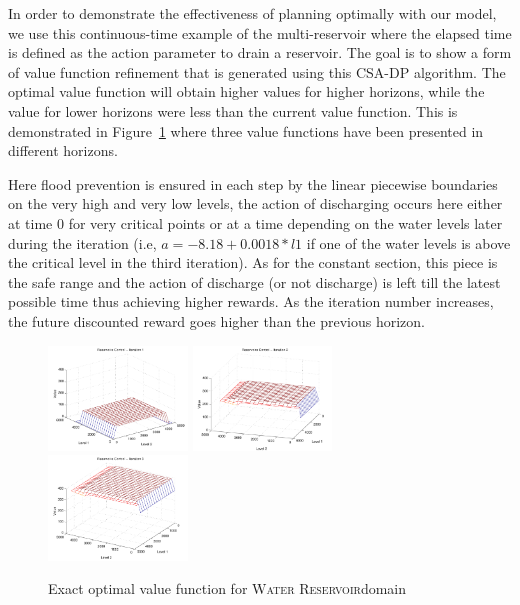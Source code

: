 \documentclass[letterpaper]{article}
\newcommand{\WaterReservoir}{\textsc{Water Reservoir}}
\begin{document}
In order to demonstrate the effectiveness of planning optimally with our model, we use this continuous-time example of the multi-reservoir where the elapsed time is defined as the action parameter to drain a reservoir. The goal is to show a form of value function refinement that is generated using this CSA-DP algorithm. The optimal value function will obtain higher values for higher horizons, while the value for lower horizons were less than the current value function. This is demonstrated in Figure~\ref{fig:reservoir} where three value functions have been presented in different horizons. 

Here flood prevention is ensured in each step by the linear piecewise boundaries on the very high and very low levels, the action of discharging occurs here either at time 0 for very critical points or at a time depending on the water levels later during the iteration (i.e, $a = -8.18 + 0.0018*l1$ if one of the water levels is above the critical level in the third iteration). As for the constant section, this piece is the safe range and the action of discharge (or not discharge) is left till the latest possible time thus achieving higher rewards. As the iteration number increases, the future discounted reward goes higher than the previous horizon. 

\begin{figure}[t]
\centering
\includegraphics[width=0.33\textwidth]{Figures1/ref1.pdf}
\includegraphics[width=0.33\textwidth]{Figures1/ref3.pdf}
\includegraphics[width=0.33\textwidth]{Figures1/ref6.pdf}
\caption{%
Exact optimal value function for \WaterReservoir domain
}
\label{fig:reservoir}
\end{figure}
\end{document}
